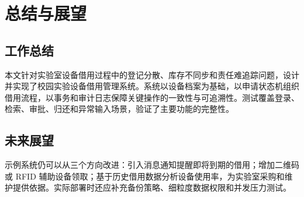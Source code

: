 \chapter{总结与展望}
\section{工作总结}
本文针对实验室设备借用过程中的登记分散、库存不同步和责任难追踪问题，设计并实现了校园实验设备借用管理系统。系统以设备档案为基础，以申请状态机组织借用流程，以事务和审计日志保障关键操作的一致性与可追溯性。测试覆盖登录、检索、审批、归还和异常输入场景，验证了主要功能的完整性。
\section{未来展望}
示例系统仍可以从三个方向改进：引入消息通知提醒即将到期的借用；增加二维码或 RFID 辅助设备领取；基于历史借用数据分析设备使用率，为实验室采购和维护提供依据。实际部署时还应补充备份策略、细粒度数据权限和并发压力测试。
